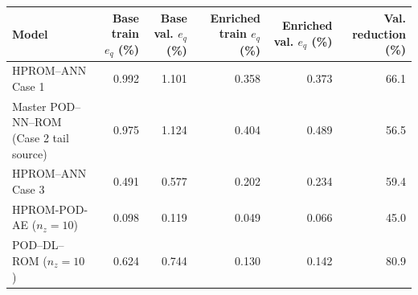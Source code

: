 \begin{tabular}{lrr|rrr}
\toprule
Model & Base train $e_q$ (\%) & Base val. $e_q$ (\%) & Enriched train $e_q$ (\%) & Enriched val. $e_q$ (\%) & Val. reduction (\%) \\
\midrule
HPROM--ANN Case 1 & 0.992 & 1.101 & 0.358 & 0.373 & 66.1 \\
Master POD--NN--ROM (Case 2 tail source) & 0.975 & 1.124 & 0.404 & 0.489 & 56.5 \\
HPROM--ANN Case 3 & 0.491 & 0.577 & 0.202 & 0.234 & 59.4 \\
HPROM-POD-AE ($n_z=10$) & 0.098 & 0.119 & 0.049 & 0.066 & 45.0 \\
POD--DL--ROM ($n_z=10$) & 0.624 & 0.744 & 0.130 & 0.142 & 80.9 \\
\bottomrule
\end{tabular}
